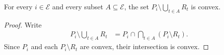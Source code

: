 \begin{lemma}
    \label{thm:area_law_fan_radial_union_deletion_convex}
    \leanok
    For every $i\in\mathcal E$ and every subset $A\subseteq\mathcal E$,
    the set $P_i\setminus\bigcup_{t\in A}R_t$ is convex.
\end{lemma}
\begin{proof}\leanok
    Write
    \begin{align}
        P_i\setminus\bigcup_{t\in A}R_t
         & =P_i\cap\bigcap_{t\in A}(P_i\setminus R_t).
    \end{align}
    Since $P_i$ and each $P_i\setminus R_t$ are convex, their intersection is
    convex.
\end{proof}
